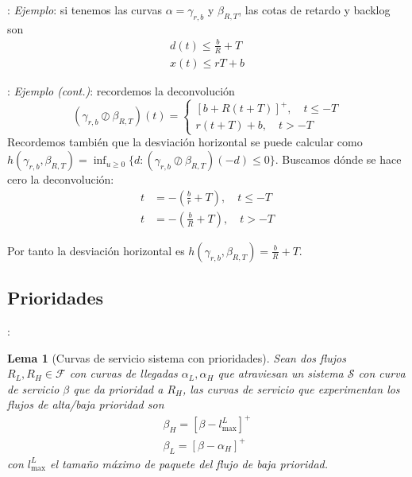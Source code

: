 \documentclass[xcolor={x11names}]{beamer}
\newtheorem{lema}{Lema}[section]
\begin{document}
\begin{frame}{\secname: \subsecname}
    \emph{Ejemplo}: si tenemos 
    las curvas $\alpha=\gamma_{r,b}$
    y $\beta_{R,T}$, las cotas de
    retardo y backlog son
    \begin{align*}
        d(t)\leq \frac{b}{R}+T\\
        x(t)\leq rT+b
    \end{align*}
    \begin{figure}[h]
        \centering
        
    \end{figure}
\end{frame}



\begin{frame}{\secname: \subsecname}
    \emph{Ejemplo (cont.)}: 
    recordemos la deconvolución 
    \begin{equation*}
        (\gamma_{r,b}
        \oslash
        \beta_{R,T})(t)
        =
        \begin{cases}
            [b+R(t+T)]^+,\quad t\leq -T\\
            r(t+T)+b,\quad t>-T
        \end{cases}
    \end{equation*}
    Recordemos también que la
    desviación horizontal se puede
    calcular como
    $h(\gamma_{r,b},\beta_{R,T})
    =\inf_{u\geq0}\{
        d: (\gamma_{r,b}\oslash\beta_{R,T})(-d)
    \leq0
    \}$.
    Buscamos dónde se hace cero la
    deconvolución:
    \begin{align*}
        t&=-(\frac{b}{r}+T),\quad t\leq -T\\
        t&=-(\frac{b}{R}+T),\quad t>-T
    \end{align*}

    Por tanto la desviación horizontal es
    $h(\gamma_{r,b},\beta_{R,T})
    =\frac{b}{R}+T$.

\end{frame}



\subsection{Prioridades}
\begin{frame}{\secname: \subsecname}
    \begin{lema}[Curvas de servicio
        sistema con prioridades]
        Sean dos flujos $R_L,R_H\in\mathcal{F}$
        con curvas de llegadas
        $\alpha_L,\alpha_H$
        que atraviesan un sistema
        $\mathcal{S}$ con curva de servicio
        $\beta$ que da prioridad
        a $R_H$, las curvas 
        de servicio que experimentan
        los flujos de alta/baja prioridad
        son
        \begin{align*}
            \beta_H=[\beta-l_{\max}^L]^+\\
            \beta_L=[\beta-\alpha_H]^+
        \end{align*}
        con $l_{\max}^L$ el tamaño máximo
        de paquete del flujo de baja
        prioridad.
    \end{lema}
\end{frame}
\end{document}
